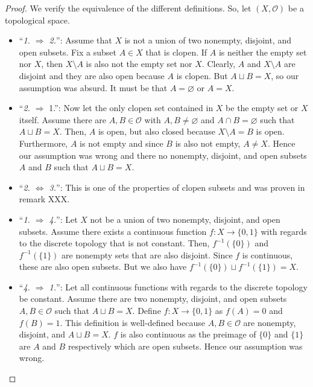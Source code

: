 \begin{proof}
    We verify the equivalence of the different definitions. So, let \((X, \mathcal{O})\) be a topological space.
    \begin{itemize}
        \item ``\textit{1. \(\Rightarrow\) 2.}'': Assume that \(X\) is not a union of two nonempty, disjoint, and open subsets. Fix a subset \(A \in X\) that is clopen. If \(A\) is neither the empty set nor \(X\), then \(X \setminus A\) is also not the empty set nor \(X\). Clearly, \(A\) and \(X \setminus A\) are disjoint and they are also open because \(A\) is clopen. But \(A \sqcup B = X\), so our assumption was absurd. It must be that \(A = \varnothing\) or \(A = X\).
        \item ``\textit{2. \(\Rightarrow\)} 1.'': Now let the only clopen set contained in \(X\) be the empty set or \(X\) itself. Assume there are \(A, B \in \mathcal{O}\) with \(A, B \neq \varnothing\) and \(A \cap B = \varnothing\) such that \(A \sqcup B = X\). Then, \(A\) is open, but also closed because \(X \setminus A = B\) is open. Furthermore, \(A\) is not empty and since \(B\) is also not empty, \(A \neq X\). Hence our assumption was wrong and there no nonempty, disjoint, and open subsets \(A\) and \(B\) such that \(A \sqcup B = X\).
        \item ``\textit{2. \(\iff\) 3.}'': This is one of the properties of clopen subsets and was proven in remark XXX.
        \item ``\textit{1. \(\Rightarrow\) 4.}'': Let \(X\) not be a union of two nonempty, disjoint, and open subsets. Assume there exists a continuous function \(f: X \longrightarrow \{0, 1\}\) with regards to the discrete topology that is not constant. Then, \(f^{-1}(\{0\})\) and \(f^{-1}(\{1\})\) are nonempty sets that are also disjoint. Since \(f\) is continuous, these are also open subsets. But we also have \(f^{-1}(\{0\}) \sqcup f^{-1}(\{1\}) = X\).
        \item ``\textit{4. \(\Rightarrow\) 1.}'': Let all continuous functions with regards to the discrete topology be constant. Assume there are two nonempty, disjoint, and open subsets \(A, B \in \mathcal{O}\) such that \(A \sqcup B = X\). Define \(f: X \longrightarrow \{0, 1\}\) as \(f(A) = 0\) and \(f(B) = 1\). This definition is well-defined because \(A, B \in \mathcal{O}\) are nonempty, disjoint, and \(A \sqcup B = X\). \(f\) is also continuous as the preimage of \(\{0\}\) and \(\{1\}\) are \(A\) and \(B\) respectively which are open subsets. Hence our assumption was wrong.
    \end{itemize}
\end{proof}
